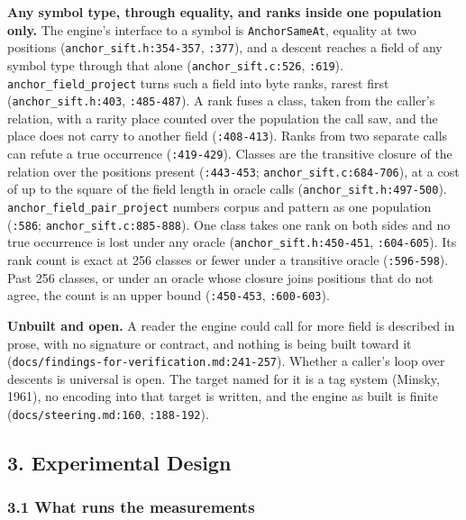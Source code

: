\noindent\textbf{Any symbol type, through equality, and ranks inside one population only.} The engine's interface to a symbol is \texttt{AnchorSameAt}, equality at two positions (\texttt{anchor\_sift.h:354-357}, \texttt{:377}), and a descent reaches a field of any symbol type through that alone (\texttt{anchor\_sift.c:526}, \texttt{:619}). \texttt{anchor\_field\_project} turns such a field into byte ranks, rarest first (\texttt{anchor\_sift.h:403}, \texttt{:485-487}). A rank fuses a class, taken from the caller's relation, with a rarity place counted over the population the call saw, and the place does not carry to another field (\texttt{:408-413}). Ranks from two separate calls can refute a true occurrence (\texttt{:419-429}). Classes are the transitive closure of the relation over the positions present (\texttt{:443-453}; \texttt{anchor\_sift.c:684-706}), at a cost of up to the square of the field length in oracle calls (\texttt{anchor\_sift.h:497-500}). \texttt{anchor\_field\_pair\_project} numbers corpus and pattern as one population (\texttt{:586}; \texttt{anchor\_sift.c:885-888}). One class takes one rank on both sides and no true occurrence is lost under any oracle (\texttt{anchor\_sift.h:450-451}, \texttt{:604-605}). Its rank count is exact at 256 classes or fewer under a transitive oracle (\texttt{:596-598}). Past 256 classes, or under an oracle whose closure joins positions that do not agree, the count is an upper bound (\texttt{:450-453}, \texttt{:600-603}).

\noindent\textbf{Unbuilt and open.} A reader the engine could call for more field is described in prose, with no signature or contract, and nothing is being built toward it (\texttt{docs/\allowbreak{}findings-\allowbreak{}for-\allowbreak{}verification.md:241-\allowbreak{}257}). Whether a caller's loop over descents is universal is open. The target named for it is a tag system (Minsky, 1961), no encoding into that target is written, and the engine as built is finite (\texttt{docs/\allowbreak{}steering.md:160}, \texttt{:188-\allowbreak{}192}).

\subsection{3. Experimental Design}

\subsubsection{3.1 What runs the measurements}

